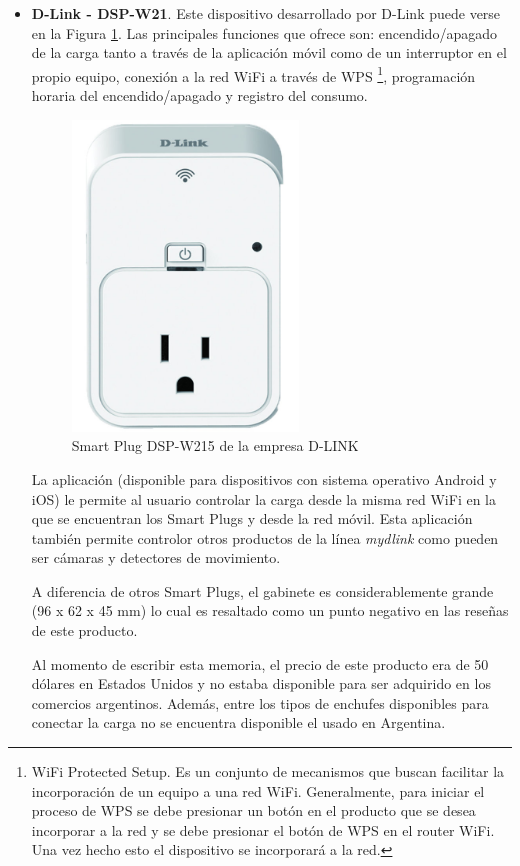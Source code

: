 \begin{itemize}
\item \textbf{D-Link - DSP-W21}. Este dispositivo desarrollado por D-Link puede verse en la Figura \ref{fig:smartplug_dlink}. Las principales funciones que ofrece son: encendido/apagado de la carga tanto a través de la aplicación móvil como de un interruptor en el propio equipo, conexión a la red WiFi a través de WPS \footnote{WiFi Protected Setup. Es un conjunto de mecanismos que buscan facilitar la incorporación de un equipo a una red WiFi. Generalmente, para iniciar el proceso de WPS se debe presionar un botón en el producto que se desea incorporar a la red y se debe presionar el botón de WPS en el router WiFi. Una vez hecho esto el dispositivo se incorporará a la red.}, programación horaria del encendido/apagado y registro del consumo.

\begin{figure}[h]
	\centering
	\includegraphics[width=6cm]{./Figures/1_2_DSP-W215.png}
	\caption{Smart Plug DSP-W215 de la empresa D-LINK}
	\label{fig:smartplug_dlink}
\end{figure}

La aplicación (disponible para dispositivos con sistema operativo Android y iOS) le permite al usuario controlar la carga desde la misma red WiFi en la que se encuentran los Smart Plugs y desde la red móvil. Esta aplicación también permite controlor otros productos de la línea  \textit{mydlink} como pueden ser cámaras y detectores de movimiento.

A diferencia de otros Smart Plugs, el gabinete es considerablemente grande (96 x 62 x 45 mm) lo cual es resaltado como un punto negativo en las reseñas de este producto.

Al momento de escribir esta memoria, el precio de este producto era de 50 dólares en Estados Unidos y no estaba disponible para ser adquirido en los comercios argentinos. Además, entre los tipos de enchufes disponibles para conectar la carga no se encuentra disponible el usado en Argentina.


\end{itemize}
